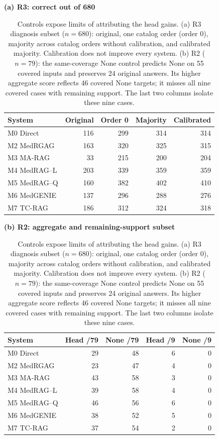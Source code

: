 \begin{table}[tb]
\centering
\small
\caption{Controls expose limits of attributing the head gains. (a) R3 diagnosis subset ($n=680$): original, one catalog order (order 0), majority across catalog orders without calibration, and calibrated majority. Calibration does not improve every system. (b) R2 ($n=79$): the same-coverage None control predicts None on 55 covered inputs and preserves 24 original answers. Its higher aggregate score reflects 46 covered None targets; it misses all nine covered cases with remaining support. The last two columns isolate these nine cases.}
\label{tab:head-controls}
\textbf{(a) R3: correct out of 680}\par\smallskip
\begin{tabular*}{\linewidth}{@{\extracolsep{\fill}}lrrrr@{}}
\toprule
System & Original & Order 0 & Majority & Calibrated \\
\midrule
M0 Direct & 116 & 299 & 314 & 314 \\
M2 MedRGAG & 163 & 320 & 325 & 315 \\
M3 MA-RAG & 33 & 215 & 200 & 204 \\
M4 MedRAG--L & 203 & 339 & 359 & 359 \\
M5 MedRAG--Q & 160 & 382 & 402 & 410 \\
M6 MedGENIE & 137 & 296 & 288 & 276 \\
M7 TC-RAG & 186 & 312 & 324 & 318 \\
\bottomrule
\end{tabular*}
\medskip
\textbf{(b) R2: aggregate and remaining-support subset}\par\smallskip
\begin{tabular*}{\linewidth}{@{\extracolsep{\fill}}lrrrr@{}}
\toprule
System & Head /79 & None /79 & Head /9 & None /9 \\
\midrule
M0 Direct & 29 & 48 & 6 & 0 \\
M2 MedRGAG & 23 & 47 & 4 & 0 \\
M3 MA-RAG & 43 & 58 & 3 & 0 \\
M4 MedRAG--L & 39 & 58 & 4 & 0 \\
M5 MedRAG--Q & 46 & 56 & 6 & 0 \\
M6 MedGENIE & 38 & 52 & 5 & 0 \\
M7 TC-RAG & 37 & 54 & 2 & 0 \\
\bottomrule
\end{tabular*}
\end{table}
